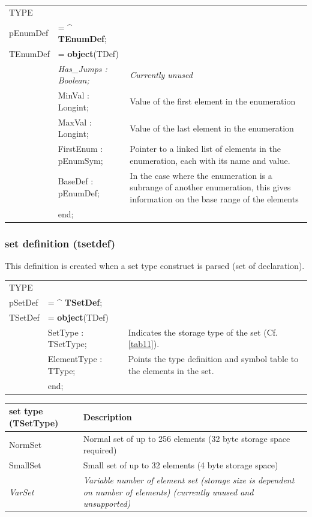 \documentclass [a4paper,12pt]{article}
\begin{document}
\begin{tabular*}{6,5in}{|l@{\extracolsep{\fill}}lp{}|}
\hline
\textsf{TYPE} & & \\
\xspace \textsf{pEnumDef} &= \^{} \textbf{TEnumDef};&  \\
\xspace \textsf{TEnumDef} &= \textbf{object}(TDef) & \\
&\textsf{\textit{Has{\_}Jumps : Boolean;}}&
    \textit{Currently unused} \\
&\textsf{MinVal : Longint;}&
    Value of the first element in the enumeration \\
&\textsf{MaxVal : Longint;}&
    Value of the last element in the enumeration \\
&\textsf{FirstEnum : pEnumSym;}&
    Pointer to a linked list of elements in the enumeration, each with
    its name and value. \\
&\textsf{BaseDef : pEnumDef;}&
    In the case where the enumeration is a subrange of another enumeration,
    this gives information on the base range of the elements \\
&\textsf{end;}&  \\
\hline
\end{tabular*}

\subsubsection{set definition (tsetdef)}
\label{subsubsec:mylabel10}

This definition is created when a set type construct is parsed (\textsf{set
of declaration}).

\begin{tabular*}{6.5in}{|l@{\extracolsep{\fill}}lp{}|}
\hline
\textsf{TYPE} & & \\
\xspace \textsf{pSetDef} &= \^{} \textbf{TSetDef};&  \\
\xspace \textsf{TSetDef} &= \textbf{object}(TDef) & \\
&\textsf{SetType : TSetType;}&
    Indicates the storage type of the set (Cf. \ref{tab11}). \\
&\textsf{ElementType : TType;}&
    Points the type definition and symbol table to the elements in the set. \\
&\textsf{end;}&  \\
\hline
\end{tabular*}

\begin{longtable}{|l|p{10cm}|}
\hline
set type (TSetType) & Description \\
\hline
\endhead
\hline
\endfoot
\textsf{NormSet}&
    Normal set of up to 256 elements (32 byte storage space required) \\
\textsf{SmallSet}&
    Small set of up to 32 elements (4 byte storage space) \\
\textsf{\textit{VarSet}}&
    \textit{Variable number of element set (storage size is dependent on number
    of elements) (currently unused and unsupported)} \\
\end{longtable}
\end{document}
